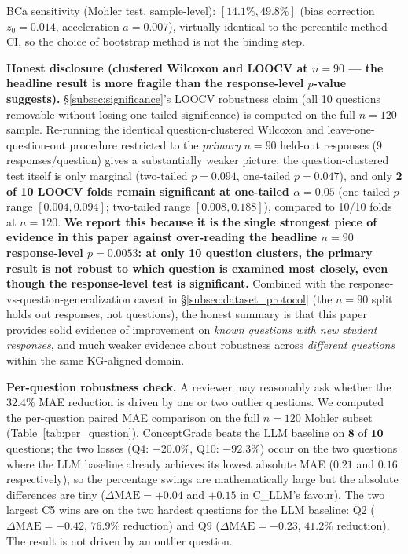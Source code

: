 \documentclass[conference]{IEEEtran}
\begin{document}
BCa sensitivity (Mohler test, sample-level): $[14.1\%, 49.8\%]$
(bias correction $z_0 = 0.014$, acceleration $a = 0.007$), virtually
identical to the percentile-method CI, so the choice of bootstrap
method is not the binding step.

\textbf{Honest disclosure (clustered Wilcoxon and LOOCV at $n=90$ ---
the headline result is more fragile than the response-level $p$-value
suggests).} \S\ref{subsec:significance}'s LOOCV robustness claim (all 10
questions removable without losing one-tailed significance) is computed
on the full $n=120$ sample. Re-running the identical question-clustered
Wilcoxon and leave-one-question-out procedure restricted to the
\emph{primary} $n=90$ held-out responses (9 responses/question) gives a
substantially weaker picture: the question-clustered test itself is only
marginal (two-tailed $p = 0.094$, one-tailed $p = 0.047$), and only
\textbf{2 of 10 LOOCV folds remain significant at one-tailed
$\alpha=0.05$} (one-tailed $p$ range $[0.004, 0.094]$; two-tailed range
$[0.008, 0.188]$), compared to 10/10 folds at $n=120$. \textbf{We report
this because it is the single strongest piece of evidence in this paper
against over-reading the headline $n=90$ response-level $p=0.0053$: at
only 10 question clusters, the primary result is not robust to which
question is examined most closely, even though the response-level test
is significant.} Combined with the response-vs-question-generalization
caveat in \S\ref{subsec:dataset_protocol} (the $n=90$ split holds out
responses, not questions), the honest summary is that this paper
provides solid evidence of improvement on \emph{known questions with new
student responses}, and much weaker evidence about robustness across
\emph{different questions} within the same KG-aligned domain.

\textbf{Per-question robustness check.} A reviewer may reasonably ask
whether the $32.4\%$ MAE reduction is driven by one or two outlier
questions. We computed the per-question paired MAE comparison on the full
$n = 120$ Mohler subset (Table~\ref{tab:per_question}). ConceptGrade
beats the LLM baseline on $\boldsymbol{8}$ of $\boldsymbol{10}$
questions; the two losses (Q4: $-20.0\%$, Q10: $-92.3\%$) occur on the
two questions where the LLM baseline already achieves its lowest
absolute MAE ($0.21$ and $0.16$ respectively), so the percentage swings
are mathematically large but the absolute differences are tiny
($\Delta \text{MAE} = +0.04$ and $+0.15$ in C\_LLM's favour). The two
largest C5 wins are on the two hardest questions for the LLM baseline:
Q2 ($\Delta\text{MAE} = -0.42$, $76.9\%$ reduction) and Q9
($\Delta\text{MAE} = -0.23$, $41.2\%$ reduction). The result is not
driven by an outlier question.
\end{document}
